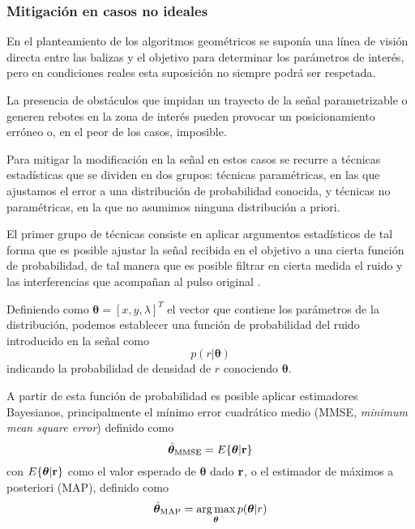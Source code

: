 \subsubsection{Mitigación en casos no ideales}

En el planteamiento de los algoritmos geométricos se suponía una línea de visión directa entre las balizas y el objetivo para determinar los parámetros de interés, pero en condiciones reales esta suposición no siempre podrá ser respetada.

La presencia de obstáculos que impidan un trayecto de la señal parametrizable o generen rebotes en la zona de interés pueden provocar un posicionamiento erróneo o, en el peor de los casos, imposible.

Para mitigar la modificación en la señal en estos casos se recurre a técnicas estadísticas que se dividen en dos grupos: técnicas paramétricas, en las que ajustamos el error a una distribución de probabilidad conocida, y técnicas no paramétricas, en la que no asumimos ninguna distribución a priori.


El primer grupo de técnicas consiste en aplicar argumentos estadísticos de tal forma que es posible ajustar la señal recibida en el objetivo a una cierta función de probabilidad, de tal manera que es posible filtrar en cierta medida el ruido y las interferencias que acompañan al pulso original \cite{Zafer}.

Definiendo como $\bm{\theta} = [x,y,\lambda]^T$ el vector que contiene los parámetros de la distribución, podemos establecer una función de probabilidad del ruido introducido en la señal como
\begin{equation}
    p(r|\bm{\theta})
\end{equation}
indicando la probabilidad de densidad de $r$ conociendo $\bm{\theta}$.

A partir de esta función de probabilidad es posible aplicar estimadores Bayesianos, principalmente el mínimo error cuadrático medio (MMSE, \textit{minimum mean square error}) definido como
\begin{equation}\label{eq:MMSE}
    \hat{\bm{\theta}}_{\text{MMSE}} = E\{\bm{\theta}|\vb{r}\}
\end{equation}
con $E\{\bm{\theta}|\vb{r}\}$ como el valor esperado de $\bm{\theta}$ dado $\vb{r}$, o el estimador de máximos a posteriori (MAP), definido como
\begin{equation}
    \hat{\bm{\theta}}_{\text{MAP}} = \operatorname*{arg\,max}_{\bm{\theta}} p(\bm{\theta}|r)
\end{equation}

